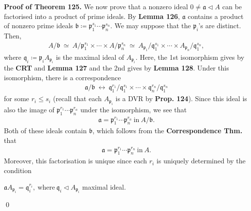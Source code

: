 \documentclass[12pt,a4paper,footinclude=true,headinclude=true]{scrbook} %
\newenvironment{proofthm}[2][Proof of Theorem]
    { \begin{mdframed}[backgroundcolor=gray!20] \textbf{#1 #2.} }
    {  \end{mdframed}}
\begin{document}
\begin{proofthm}{125}
    We now prove that a nonzero ideal $0\neq \mathfrak{a}\triangleleft A$ can be factorised into a product of prime ideals. By \textbf{Lemma 126}, $\mathfrak{a}$ contains a product of nonzero prime ideals $\mathfrak{b}\coloneqq\mathfrak{p}_1^{s_1}\cdots\mathfrak{p}_n^{s_n}$.
    We may suppose that the $\mathfrak{p}_i$'s are distinct. Then, 
    \begin{align*}
        A/\mathfrak{b}\ \simeq\ A/\mathfrak{p}_1^{s_1}\times\cdots\times
        A/\mathfrak{p}_n^{s_n}\ \simeq\  A_{\mathfrak{p}_1}/\mathfrak{q}_1^{s_1}\times\cdots\times
        A_{\mathfrak{p}_n}/\mathfrak{q}_1^{s_n},
    \end{align*}
    where $\mathfrak{q}_i\coloneqq\mathfrak{p}_iA_{\mathfrak{p}_i}$ is the maximal ideal of $A_{\mathfrak{p}_i}$. Here, the 1st isomorphism gives by the \textbf{CRT} and \textbf{Lemma 127} and the 2nd gives by \textbf{Lemma 128}. Under this isomorphism, there is a correspondence
    \begin{align*}
        \mathfrak{a}/\mathfrak{b}\ \longleftrightarrow\  \mathfrak{q}_1^{r_1}/\mathfrak{q}_1^{s_1} \times\cdots\times\mathfrak{q}_n^{r_n}/\mathfrak{q}_1^{s_n}
    \end{align*}
    for some $r_i\leq s_i$ (recall that each $A_{\mathfrak{p}_i}$ is a DVR by \textbf{Prop. 124}). Since this ideal is also the image of $\mathfrak{p}_1^{r_1}\cdots\mathfrak{p}_n^{r_n}$ under the isomorphism, we see that 
    \begin{align*}
        \mathfrak{a}= \mathfrak{p}_1^{r_1}\cdots\mathfrak{p}_n^{r_n}\ \text{in}\ A/\mathfrak{b}.
    \end{align*}
    Both of these ideals contain $\mathfrak{b}$, which follows from the \textbf{Correspondence Thm.} that
    \begin{align*}
        \mathfrak{a}= \mathfrak{p}_1^{r_1}\cdots\mathfrak{p}_n^{r_n}\ \text{in}\ A.
    \end{align*}
    Moreover, this factorisation is unique since each $r_i$ is uniquely determined by the condition\\ \centerline{$\mathfrak{a} A_{\mathfrak{p}_i}=\mathfrak{q}_i^{r_i},\ \text{where}\  \mathfrak{q}_i \triangleleft A_{\mathfrak{p}_i}$ maximal ideal.} \qed
\end{proofthm}
\end{document}
